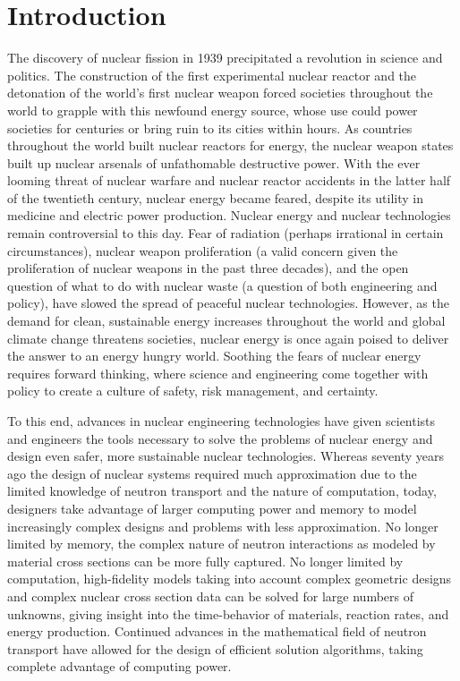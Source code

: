 \chapter{Introduction}

The discovery of nuclear fission in 1939 precipitated a revolution in science and politics. The construction of the first experimental nuclear reactor and the detonation of the world's first nuclear weapon forced societies throughout the world to grapple with this newfound energy source, whose use could power societies for centuries or bring ruin to its cities within hours. As countries throughout the world built nuclear reactors for energy, the nuclear weapon states built up nuclear arsenals of unfathomable destructive power. With the ever looming threat of nuclear warfare and nuclear reactor accidents in the latter half of the twentieth century, nuclear energy became feared, despite its utility in medicine and electric power production.  Nuclear energy and nuclear technologies remain controversial to this day. Fear of radiation (perhaps irrational in certain circumstances), nuclear weapon proliferation (a valid concern given the proliferation of nuclear weapons in the past three decades), and the open question of what to do with nuclear waste (a question of both engineering and policy), have slowed the spread of peaceful nuclear technologies. However, as the demand for clean, sustainable energy increases throughout the world and global climate change threatens societies, nuclear energy is once again poised to deliver the answer to an energy hungry world. Soothing the fears of nuclear energy requires forward thinking, where science and engineering come together with policy to create a culture of safety, risk management, and certainty. 

To this end, advances in nuclear engineering technologies have given scientists and engineers the tools necessary to solve the problems of nuclear energy and design even safer, more sustainable nuclear technologies. Whereas seventy years ago the design of nuclear systems required much approximation due to the limited knowledge of neutron transport and the nature of computation, today, designers take advantage of larger computing power and memory to model increasingly complex designs and problems with less approximation. No longer limited by memory, the complex nature of neutron interactions as modeled by material cross sections can be more fully captured. No longer limited by computation, high-fidelity models taking into account complex geometric designs and complex nuclear cross section data can be solved for large numbers of unknowns, giving insight into the time-behavior of materials, reaction rates, and energy production. Continued advances in the mathematical field of neutron transport have allowed for the design of efficient solution algorithms, taking complete advantage of computing power. 

